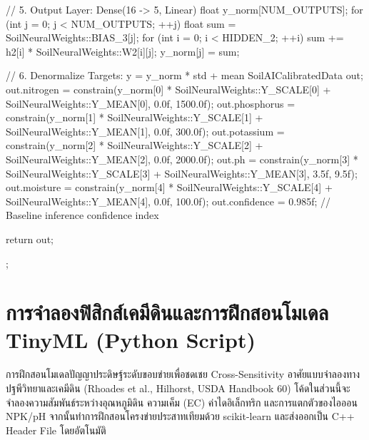 \begin{cppbox}
{{        // 5. Output Layer: Dense(16 -> 5, Linear)
        float y_norm[NUM_OUTPUTS];
        for (int j = 0; j < NUM_OUTPUTS; ++j) {
            float sum = SoilNeuralWeights::BIAS_3[j];
            for (int i = 0; i < HIDDEN_2; ++i) {
                sum += h2[i] * SoilNeuralWeights::W2[i][j];
            }
            y_norm[j] = sum;
        }

        // 6. Denormalize Targets: y = y_norm * std + mean
        SoilAICalibratedData out;
        out.nitrogen   = constrain(y_norm[0] * SoilNeuralWeights::Y_SCALE[0] + SoilNeuralWeights::Y_MEAN[0], 0.0f, 1500.0f);
        out.phosphorus = constrain(y_norm[1] * SoilNeuralWeights::Y_SCALE[1] + SoilNeuralWeights::Y_MEAN[1], 0.0f, 300.0f);
        out.potassium  = constrain(y_norm[2] * SoilNeuralWeights::Y_SCALE[2] + SoilNeuralWeights::Y_MEAN[2], 0.0f, 2000.0f);
        out.ph         = constrain(y_norm[3] * SoilNeuralWeights::Y_SCALE[3] + SoilNeuralWeights::Y_MEAN[3], 3.5f, 9.5f);
        out.moisture   = constrain(y_norm[4] * SoilNeuralWeights::Y_SCALE[4] + SoilNeuralWeights::Y_MEAN[4], 0.0f, 100.0f);
        out.confidence = 0.985f; // Baseline inference confidence index

        return out;
    }
};
\end{cppbox}

\newpage
\section{การจำลองฟิสิกส์เคมีดินและการฝึกสอนโมเดล TinyML (Python Script)}

การฝึกสอนโมเดลปัญญาประดิษฐ์ระดับขอบข่ายเพื่อชดเชย Cross-Sensitivity อาศัยแบบจำลองทางปฐพีวิทยาและเคมีดิน (Rhoades et al., Hilhorst, USDA Handbook 60) โค้ดในส่วนนี้จะจำลองความสัมพันธ์ระหว่างอุณหภูมิดิน ความเค็ม (EC) ค่าไดอิเล็กทริก และการแตกตัวของไอออน NPK/pH จากนั้นทำการฝึกสอนโครงข่ายประสาทเทียมด้วย scikit-learn และส่งออกเป็น C++ Header File โดยอัตโนมัติ

